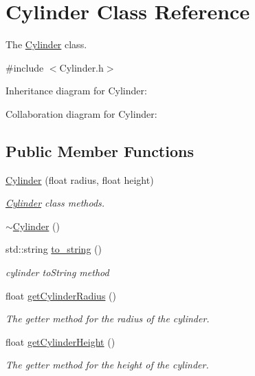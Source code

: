 \hypertarget{classCylinder}{}\section{Cylinder Class Reference}
\label{classCylinder}


The \hyperlink{classCylinder}{Cylinder} class.  




{\ttfamily \#include $<$Cylinder.\+h$>$}



Inheritance diagram for Cylinder\+:


Collaboration diagram for Cylinder\+:
\subsection*{Public Member Functions}
\begin{DoxyCompactItemize}
\item 
\hyperlink{classCylinder_a7fc7f1cbffd048f423f7c0194c972348}{Cylinder} (float radius, float height)
\begin{DoxyCompactList}\small\item\em \hyperlink{classCylinder}{Cylinder} class methods. \end{DoxyCompactList}\item 
\hyperlink{classCylinder_a05ab556f0ae3cd6e99d9d1f3caca80b3}{$\sim$\+Cylinder} ()
\item 
std\+::string \hyperlink{classCylinder_ab889918992534ba45ddb11a3e4b64481}{to\+\_\+string} ()
\begin{DoxyCompactList}\small\item\em cylinder to\+String method \end{DoxyCompactList}\item 
float \hyperlink{classCylinder_aafe370beb2f072d41fa79deb696e4d40}{get\+Cylinder\+Radius} ()
\begin{DoxyCompactList}\small\item\em The getter method for the radius of the cylinder. \end{DoxyCompactList}\item 
float \hyperlink{classCylinder_af7ffa75cdd7dd37d6c27f449330c4ce2}{get\+Cylinder\+Height} ()
\begin{DoxyCompactList}\small\item\em The getter method for the height of the cylinder. \end{DoxyCompactList}\end{DoxyCompactItemize}
